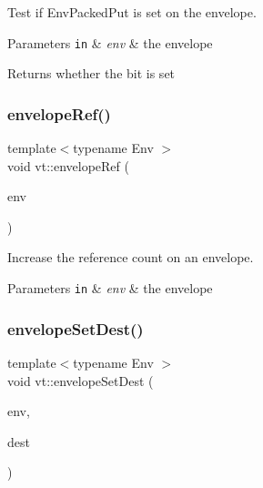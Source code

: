 Test if {\ttfamily Env\+Packed\+Put} is set on the envelope. 


\begin{DoxyParams}[1]{Parameters}
\mbox{\tt in}  & {\em env} & the envelope\\
\hline
\end{DoxyParams}
\begin{DoxyReturn}{Returns}
whether the bit is set 
\end{DoxyReturn}
\mbox{\label{namespacevt_a68c41bd1b8addd0f8feea15a61d5c372}} 
\subsubsection{\texorpdfstring{envelope\+Ref()}{envelopeRef()}}
{\footnotesize\ttfamily template$<$typename Env $>$ \\
void vt\+::envelope\+Ref (\begin{DoxyParamCaption}\item[{Env \&}]{env }\end{DoxyParamCaption})\hspace{0.3cm}{\ttfamily [inline]}}



Increase the reference count on an envelope. 


\begin{DoxyParams}[1]{Parameters}
\mbox{\tt in}  & {\em env} & the envelope \\
\hline
\end{DoxyParams}
\mbox{\label{namespacevt_a78ef1cf108e91a92d83c525fd16fbd4d}} 
\subsubsection{\texorpdfstring{envelope\+Set\+Dest()}{envelopeSetDest()}}
{\footnotesize\ttfamily template$<$typename Env $>$ \\
void vt\+::envelope\+Set\+Dest (\begin{DoxyParamCaption}\item[{Env \&}]{env,  }\item[{\hyperlink{namespacevt_a866da9d0efc19c0a1ce79e9e492f47e2}{Node\+Type} const \&}]{dest }\end{DoxyParamCaption})\hspace{0.3cm}{\ttfamily [inline]}}



